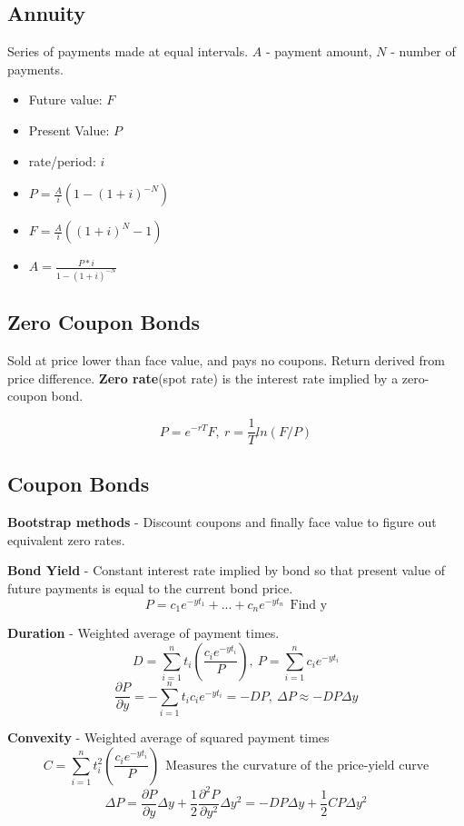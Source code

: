 \documentclass{article}
\begin{document}
\subsection*{Annuity}

Series of payments made at equal intervals. $A$ - payment amount, $N$ - number of payments.

\begin{itemize}
	\item Future value: $F$
	\item Present Value: $P$
	\item rate/period: $i$
	\item $P = \frac{A}{i}\left(1 - (1+i)^{-N}\right)$
	\item $F = \frac{A}{i}\left((1+i)^N - 1\right)$
	\item $A = \frac{P * i}{1 - (1+i)^{-N}}$
\end{itemize}

\subsection*{Zero Coupon Bonds}

Sold at price lower than face value, and pays no coupons. Return derived from price difference. \textbf{Zero rate}(spot rate) is the interest rate implied by a zero-coupon bond. 

$$P = e^{-rT}F, \ r = \frac{1}{T}ln(F/P)$$


\subsection*{Coupon Bonds}

\textbf{Bootstrap methods} - Discount coupons and finally face value to figure out equivalent zero rates. 

\textbf{Bond Yield}  - Constant interest rate implied by bond so that present value of future payments is equal to the current bond price. 
$$P = c_1e^{-yt_1} + ... + c_ne^{-yt_n} \ \ \text{Find y}$$

\textbf{Duration} - Weighted average of payment times. 
$$D = \sum_{i=1}^n t_i \left(\frac{c_ie^{-yt_i}}{P}\right), \ P = \sum_{i=1}^n c_ie^{-yt_i}$$
$$\frac{\partial P}{\partial y} = - \sum_{i=1}^n t_ic_ie^{-yt_i} = -DP, \ \Delta P \approx - DP\Delta y$$

\textbf{Convexity} - Weighted average of squared payment times
$$C = \sum_{i=1}^n t_i^2 \left(\frac{c_i e^{-yt_i}}{P}\right) \ \ \text{Measures the curvature of the price-yield curve}$$
$$\Delta P = \frac{\partial P}{\partial y} \Delta y + \frac{1}{2} \frac{\partial^2 P}{\partial y^2} \Delta y^2 = - DP\Delta y + \frac{1}{2} CP\Delta y^2$$
\end{document}

